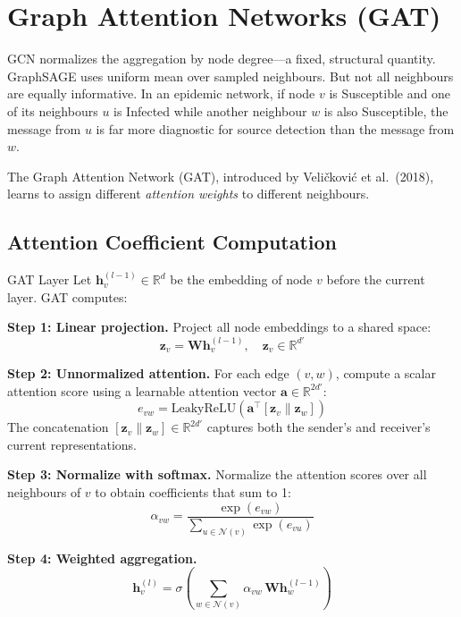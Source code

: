 \section{Graph Attention Networks (GAT)}

GCN normalizes the aggregation by node degree---a fixed, structural quantity. GraphSAGE uses uniform mean over sampled neighbours. But not all neighbours are equally informative. In an epidemic network, if node $v$ is Susceptible and one of its neighbours $u$ is Infected while another neighbour $w$ is also Susceptible, the message from $u$ is far more diagnostic for source detection than the message from $w$.

The Graph Attention Network (GAT), introduced by Veli{\v{c}}kovi{\'c} et al.\ (2018), learns to assign different \emph{attention weights} to different neighbours.

\subsection{Attention Coefficient Computation}

\begin{mathbox}{GAT Layer}
Let $\mathbf{h}_v^{(l-1)} \in \mathbb{R}^{d}$ be the embedding of node $v$ before the current layer. GAT computes:

\textbf{Step 1: Linear projection.} Project all node embeddings to a shared space:
\[
\mathbf{z}_v = \mathbf{W} \mathbf{h}_v^{(l-1)}, \quad \mathbf{z}_v \in \mathbb{R}^{d'}
\]

\textbf{Step 2: Unnormalized attention.} For each edge $(v, w)$, compute a scalar attention score using a learnable attention vector $\mathbf{a} \in \mathbb{R}^{2d'}$:
\begin{equation}
    e_{vw} = \text{LeakyReLU}\!\left(\mathbf{a}^\top\!\left[\mathbf{z}_v \| \mathbf{z}_w\right]\right)
    \label{eq:gat_attn}
\end{equation}
The concatenation $[\mathbf{z}_v \| \mathbf{z}_w] \in \mathbb{R}^{2d'}$ captures both the sender's and receiver's current representations.

\textbf{Step 3: Normalize with softmax.} Normalize the attention scores over all neighbours of $v$ to obtain coefficients that sum to 1:
\begin{equation}
    \alpha_{vw} = \frac{\exp(e_{vw})}{\sum_{u \in \mathcal{N}(v)} \exp(e_{vu})}
    \label{eq:gat_softmax}
\end{equation}

\textbf{Step 4: Weighted aggregation.}
\begin{equation}
    \mathbf{h}_v^{(l)} = \sigma\!\left(\sum_{w \in \mathcal{N}(v)} \alpha_{vw}\, \mathbf{W} \mathbf{h}_w^{(l-1)}\right)
    \label{eq:gat_update}
\end{equation}
\end{mathbox}

